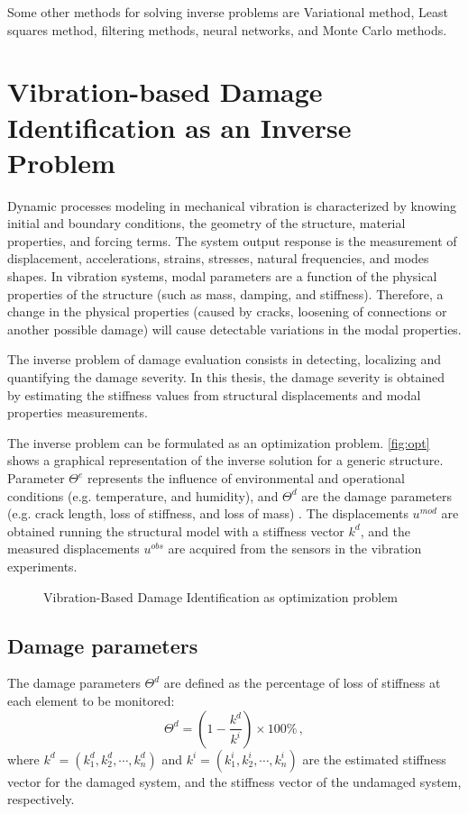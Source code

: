 Some other methods for solving inverse problems are Variational method, Least squares method, filtering methods, neural networks, and Monte Carlo methods.
    
\section{Vibration-based Damage Identification as an Inverse Problem}

Dynamic processes modeling in mechanical vibration is characterized by knowing initial and boundary conditions, the geometry of the structure, material properties, and forcing terms. The system output response is the measurement of displacement, accelerations, strains, stresses, natural frequencies, and modes shapes. In vibration systems, modal parameters are a function of the physical properties of the structure (such as mass, damping, and stiffness). Therefore, a change in the physical properties (caused by cracks, loosening of connections or another possible damage) will cause detectable variations in the modal properties.

The inverse problem of damage evaluation consists in detecting, localizing and quantifying the damage severity. In this thesis, the damage severity is obtained by estimating the stiffness values from structural displacements and modal properties measurements.

The inverse problem can be formulated as an optimization problem.  \autoref{fig:opt} shows a graphical representation of the inverse solution for a generic structure. Parameter $\Theta^e$ represents the influence of environmental and operational conditions (e.g. temperature, and humidity), and $\Theta^d$ are the damage parameters (e.g. crack length, loss of stiffness, and loss of mass) \cite{Fritzen2009}. The displacements ${u}^{{mod}}$ are obtained running the structural model with a stiffness vector $k^d$, and the measured displacements ${u}^{{obs}}$ are acquired from the sensors in the vibration experiments.

\begin{figure}[H]
    \caption{Vibration-Based Damage Identification as optimization problem}
    \label{fig:opt}
    \centering
    \vspace{1em}
\end{figure}

\subsection{Damage parameters}
The damage parameters $\Theta^d$ are defined as the percentage of loss of stiffness at each element to be monitored:
%
\begin{equation}
\label{eq:thetad}
\Theta^d = \left( 1 - \frac{k^d}{k^i} \right) \times 100\%\,,
\end{equation}
%
where $k^d = \left(k^d_1, k^d_2, \cdots, k^d_n\right)$ and $k^i = \left(k^i_1, k^i_2, \cdots, k^i_n\right)$ are the estimated stiffness vector for the damaged system, and the stiffness vector of the undamaged system, respectively.


